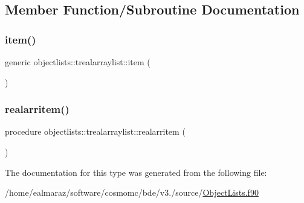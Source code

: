 \subsection{Member Function/\+Subroutine Documentation}
\mbox{\label{structobjectlists_1_1trealarraylist_a6643ba94ad4b7c66ac51846763715bef}} 
\subsubsection{\texorpdfstring{item()}{item()}}
{\footnotesize\ttfamily generic objectlists\+::trealarraylist\+::item (\begin{DoxyParamCaption}{ }\end{DoxyParamCaption})\hspace{0.3cm}{\ttfamily [private]}}

\mbox{\label{structobjectlists_1_1trealarraylist_abe6fbf3ac5da2daa8d5a9478cc6967ad}} 
\subsubsection{\texorpdfstring{realarritem()}{realarritem()}}
{\footnotesize\ttfamily procedure objectlists\+::trealarraylist\+::realarritem (\begin{DoxyParamCaption}{ }\end{DoxyParamCaption})\hspace{0.3cm}{\ttfamily [private]}}



The documentation for this type was generated from the following file\+:\begin{DoxyCompactItemize}
\item 
/home/ealmaraz/software/cosmomc/bde/v3./source/\mbox{\hyperlink{ObjectLists_8f90}{Object\+Lists.\+f90}}\end{DoxyCompactItemize}
